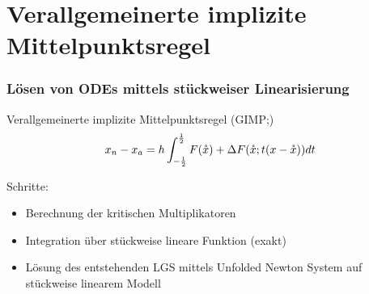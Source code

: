 \section[GIMP]{Verallgemeinerte implizite Mittelpunktsregel}
\begin{frame}[<+->]
\frametitle{Lösen von ODEs mittels stückweiser Linearisierung}
 \begin{block}{Verallgemeinerte implizite Mittelpunktsregel (GIMP;\cite[Eq. 14]{monster})}
 \[
  x_n - x_a = h\int_{-\frac{1}{2}}^{\frac{1}{2}} F(\mathring{x}) + \Delta F(\mathring{x}; t(x-\mathring{x}))dt
 \]
\end{block}
Schritte:
\begin{itemize}
 \item Berechnung der kritischen Multiplikatoren
 \item Integration über stückweise lineare Funktion (exakt)
 \item Lösung des entstehenden LGS mittels Unfolded Newton System auf stückweise linearem Modell
\end{itemize}

\end{frame}

